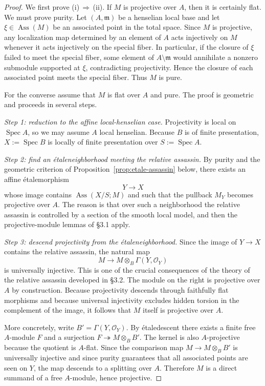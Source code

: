 \documentclass[11pt,oneside]{article}
\newcommand{\OO}{\mathcal O}
\newcommand{\Spec}{\operatorname{Spec}}
\newcommand{\Ass}{\operatorname{Ass}}
\newcommand{\ot}{\otimes}
\newcommand{\etale}{\'etale}
\begin{document}
\begin{proof}
We first prove \textup{(i)}\,$\Rightarrow$\,\textup{(ii)}.  If $M$ is projective over $A$, then it is certainly flat.  We must prove purity.  Let $(A,\mathfrak m)$ be a henselian local base and let $\xi\in\Ass(M)$ be an associated point in the total space.  Since $M$ is projective, any localization map determined by an element of $A$ acts injectively on $M$ whenever it acts injectively on the special fiber.  In particular, if the closure of $\xi$ failed to meet the special fiber, some element of $A\setminus\mathfrak m$ would annihilate a nonzero submodule supported at $\xi$, contradicting projectivity.  Hence the closure of each associated point meets the special fiber.  Thus $M$ is pure.

For the converse assume that $M$ is flat over $A$ and pure.  The proof is geometric and proceeds in several steps.

\smallskip
\noindent\emph{Step 1: reduction to the affine local-henselian case.}
Projectivity is local on $\Spec A$, so we may assume $A$ local henselian.  Because $B$ is of finite presentation, $X:=\Spec B$ is locally of finite presentation over $S:=\Spec A$.

\smallskip
\noindent\emph{Step 2: find an \etale neighborhood meeting the relative assassin.}
By purity and the geometric criterion of Proposition~\ref{prop:etale-assassin} below, there exists an affine \etale morphism
\[
Y\to X
\]
whose image contains $\Ass(X/S;M)$ and such that the pullback $M_Y$ becomes projective over $A$.  The reason is that over such a neighborhood the relative assassin is controlled by a section of the smooth local model, and then the projective-module lemmas of \S3.1 apply.

\smallskip
\noindent\emph{Step 3: descend projectivity from the \etale neighborhood.}
Since the image of $Y\to X$ contains the relative assassin, the natural map
\[
M\longrightarrow M\ot_B \Gamma(Y,\OO_Y)
\]
is universally injective.  This is one of the crucial consequences of the theory of the relative assassin developed in \S3.2.  The module on the right is projective over $A$ by construction.  Because projectivity descends through faithfully flat morphisms and because universal injectivity excludes hidden torsion in the complement of the image, it follows that $M$ itself is projective over $A$.

More concretely, write $B' = \Gamma(Y,\OO_Y)$.  By \etale descent there exists a finite free $A$-module $F$ and a surjection $F\twoheadrightarrow M\ot_B B'$.  The kernel is also $A$-projective because the quotient is $A$-flat.  Since the comparison map $M\to M\ot_B B'$ is universally injective and since purity guarantees that all associated points are seen on $Y$, the map descends to a splitting over $A$.  Therefore $M$ is a direct summand of a free $A$-module, hence projective.
\end{proof}
\end{document}
